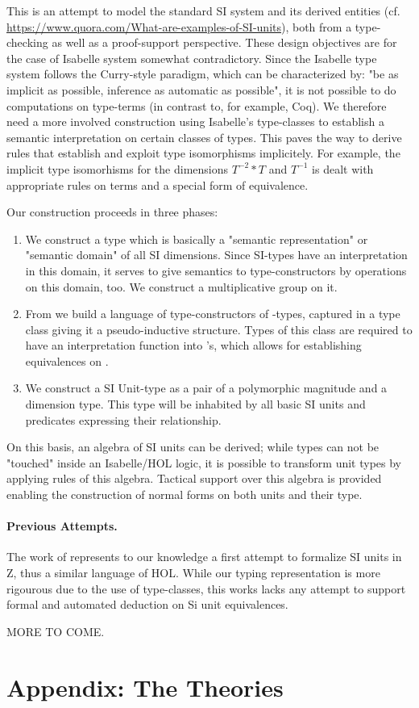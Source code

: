 \documentclass[11pt,a4paper]{book}
\begin{document}
This is an attempt to model the standard SI system and its derived entities (cf.
\url{https://www.quora.com/What-are-examples-of-SI-units}),
both from a type-checking as well as a proof-support perspective.
These design objectives are for the case of Isabelle system somewhat contradictory.
Since the Isabelle type system follows the Curry-style paradigm, which can be 
characterized by: "be as implicit as possible, inference as automatic as possible", it is not
possible to do computations on type-terms (in contrast to, for example, Coq). We therefore
need a more involved construction using Isabelle's type-classes to establish a semantic 
interpretation on certain classes of types. This paves the way to derive rules that
establish and exploit type isomorphisms implicitely. For example, the implicit
type isomorhisms for the dimensions $T^{-2} * T$ and $T^{-1}$ is dealt with appropriate
rules on terms and a special form of equivalence. 

Our construction proceeds in three phases:
\begin{enumerate}%
\item We construct a type  which is basically a "semantic representation" or
"semantic domain" of all SI dimensions. Since SI-types have an interpretation in this domain,
it serves to give semantics to type-constructors by operations on this domain, too.
We construct a multiplicative group on it.

\item From  we build a language of type-constructors of -types, 
 captured in a type class  giving it a pseudo-inductive structure. Types of
 this class are required to have  an interpretation function into 's, which
 allows for establishing equivalences on .
      
\item We construct a SI Unit-type as a pair of a polymorphic magnitude and a dimension type.
  This type will be inhabited by all basic SI units and predicates expressing their relationship.
\end{enumerate}%

On this basis, an algebra of SI units can be derived; while types can not be "touched" inside
an Isabelle/HOL logic, it is possible to transform unit types by applying rules of this algebra.
Tactical support over this algebra is provided enabling the construction of normal forms on 
both units and their type.  

\subsubsection{Previous Attempts.} The work of \cite{HayesBrendan95} represents to our knowledge a
first attempt to formalize SI units in Z, thus a similar language of HOL. While our typing
representation is more rigourous due to the use of type-classes, this works lacks any attempt
to support formal and automated deduction on Si unit equivalences.

MORE TO COME.

\chapter{Appendix: The Theories}





\end{document}
